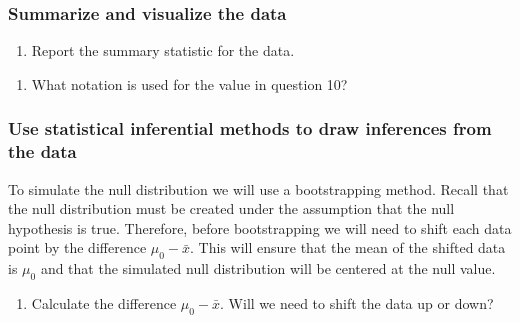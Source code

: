 \documentclass[
]{report}
\providecommand{\tightlist}{%
  \setlength{\itemsep}{0pt}\setlength{\parskip}{0pt}}
\begin{document}
\vspace{1in}

\hypertarget{summarize-and-visualize-the-data-2}{%
\subsubsection*{Summarize and visualize the data}\label{summarize-and-visualize-the-data-2}}

\begin{enumerate}
\def\labelenumi{\arabic{enumi}.}
\setcounter{enumi}{9}
\tightlist
\item
  Report the summary statistic for the data.
\end{enumerate}

\vspace{0.3in}

\begin{enumerate}
\def\labelenumi{\arabic{enumi}.}
\setcounter{enumi}{10}
\tightlist
\item
  What notation is used for the value in question 10?
\end{enumerate}

\vspace{0.3in}

\hypertarget{use-statistical-inferential-methods-to-draw-inferences-from-the-data}{%
\subsubsection*{Use statistical inferential methods to draw inferences from the data}\label{use-statistical-inferential-methods-to-draw-inferences-from-the-data}}

To simulate the null distribution we will use a bootstrapping method. Recall that the null distribution must be created under the assumption that the null hypothesis is true. Therefore, before bootstrapping we will need to shift each data point by the difference \(\mu_0 - \bar{x}\). This will ensure that the mean of the shifted data is \(\mu_0\) and that the simulated null distribution will be centered at the null value.

\begin{enumerate}
\def\labelenumi{\arabic{enumi}.}
\setcounter{enumi}{11}
\tightlist
\item
  Calculate the difference \(\mu_0 - \bar{x}\). Will we need to shift the data up or down?
\end{enumerate}
\end{document}
